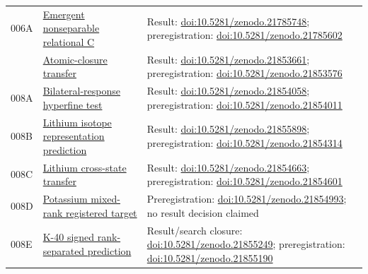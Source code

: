 \documentclass[11pt,a4paper]{article}
\begin{document}
\begin{longtable}{@{}>{\raggedright\arraybackslash}p{1.2cm}>{\raggedright\arraybackslash}p{5.0cm}>{\raggedright\arraybackslash}p{7.8cm}@{}}
006A & \href{https://github.com/SIEL-Research/Subjectivity-Intersection-Mathematics/tree/main/experiments/006a_emergent_nonseparable_relational_c}{Emergent nonseparable relational C} & Result: \href{https://doi.org/10.5281/zenodo.21785748}{doi:10.5281/zenodo.21785748}; preregistration: \href{https://doi.org/10.5281/zenodo.21785602}{doi:10.5281/zenodo.21785602} \\
008 & \href{https://github.com/SIEL-Research/Subjectivity-Intersection-Mathematics/tree/main/experiments/008_preregistered_atomic_closure_transfer}{Atomic-closure transfer} & Result: \href{https://doi.org/10.5281/zenodo.21853661}{doi:10.5281/zenodo.21853661}; preregistration: \href{https://doi.org/10.5281/zenodo.21853576}{doi:10.5281/zenodo.21853576} \\
008A & \href{https://github.com/SIEL-Research/Subjectivity-Intersection-Mathematics/tree/main/experiments/008a_bilateral_reentry_hyperfine_prediction}{Bilateral-response hyperfine test} & Result: \href{https://doi.org/10.5281/zenodo.21854058}{doi:10.5281/zenodo.21854058}; preregistration: \href{https://doi.org/10.5281/zenodo.21854011}{doi:10.5281/zenodo.21854011} \\
008B & \href{https://github.com/SIEL-Research/Subjectivity-Intersection-Mathematics/tree/main/experiments/008b_pyscf_lithium_spin_representation_prediction}{Lithium isotope representation prediction} & Result: \href{https://doi.org/10.5281/zenodo.21855898}{doi:10.5281/zenodo.21855898}; preregistration: \href{https://doi.org/10.5281/zenodo.21854314}{doi:10.5281/zenodo.21854314} \\
008C & \href{https://github.com/SIEL-Research/Subjectivity-Intersection-Mathematics/tree/main/experiments/008c_lithium_2p_cross_state_transfer}{Lithium cross-state transfer} & Result: \href{https://doi.org/10.5281/zenodo.21854663}{doi:10.5281/zenodo.21854663}; preregistration: \href{https://doi.org/10.5281/zenodo.21854601}{doi:10.5281/zenodo.21854601} \\
008D & \href{https://github.com/SIEL-Research/Subjectivity-Intersection-Mathematics/tree/main/experiments/008d_pyscf_potassium_mixed_rank_prediction}{Potassium mixed-rank registered target} & Preregistration: \href{https://doi.org/10.5281/zenodo.21854993}{doi:10.5281/zenodo.21854993}; no result decision claimed \\
008E & \href{https://github.com/SIEL-Research/Subjectivity-Intersection-Mathematics/tree/main/experiments/008e_potassium40_signed_rank_prediction}{K-40 signed rank-separated prediction} & Result/search closure: \href{https://doi.org/10.5281/zenodo.21855249}{doi:10.5281/zenodo.21855249}; preregistration: \href{https://doi.org/10.5281/zenodo.21855190}{doi:10.5281/zenodo.21855190} \\

\end{longtable}
\end{document}
